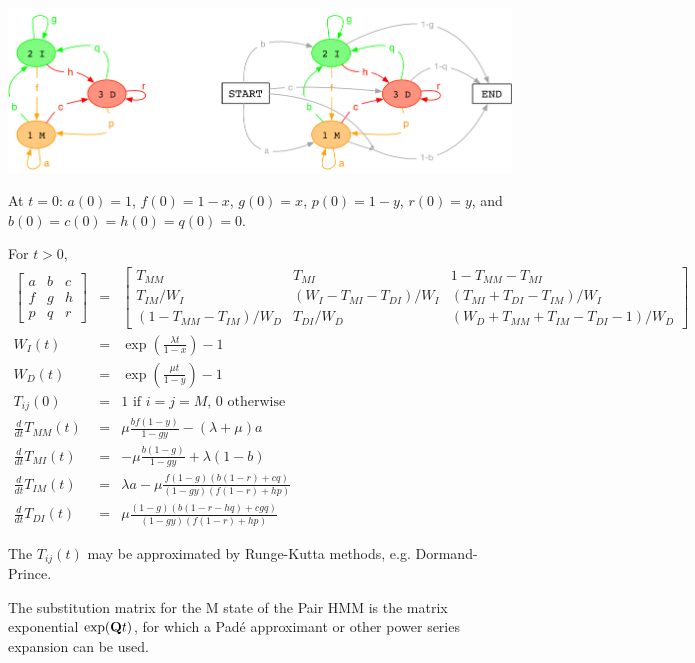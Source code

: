 \documentclass{article}
\begin{document}
\includegraphics[width=\textwidth]{PairHMM.pdf}

At $t=0$: $a(0)=1$, $f(0)=1-x$, $g(0)=x$, $p(0)=1-y$, $r(0)=y$, and $b(0)=c(0)=h(0)=q(0)=0$.

For $t>0$, %
\begin{eqnarray*}
\begin{bmatrix}
a & b & c \\
f & g & h \\
p & q & r 
\end{bmatrix}
& = &
\begin{bmatrix}
T_{MM} & T_{MI} & 1-T_{MM}-T_{MI} \\
T_{IM}/W_I & (W_I-T_{MI}-T_{DI})/W_I & (T_{MI}+T_{DI}-T_{IM})/W_I \\
(1-T_{MM}-T_{IM})/W_D & T_{DI}/W_D & (W_D+T_{MM}+T_{IM}-T_{DI}-1)/W_D 
\end{bmatrix}
\\
W_I(t) & = & \exp\left(\frac{\lambda t}{1-x}\right)-1 \\
W_D(t) & = & \exp\left(\frac{\mu t}{1-y}\right)-1 \\
T_{ij}(0) & = & \mbox{1 if $i=j=M$, 0 otherwise}
\\
  \frac{d}{dt} T_{MM}(t) & = &
  \mu \frac{b f (1-y)}{1 - g y}-(\lambda +\mu )a
  \nonumber \\
  \frac{d}{dt} T_{MI}(t) & = &
  -\mu \frac{b (1-g)}{1 - g y} + \lambda (1-b)
  \nonumber \\
  \frac{d}{dt} T_{IM}(t) & = &
  \lambda a - \mu \frac{f (1-g) (b (1-r)+c q)}{(1 - g y) (f (1-r)+h p)}
  \nonumber \\
  \frac{d}{dt} T_{DI}(t) & = &
  \mu \frac{(1-g) (b (1-r-h q)+c g q)}{(1-g y) (f (1-r)+h p)}
\end{eqnarray*}

The $T_{ij}(t)$ may be approximated by Runge-Kutta methods,
e.g. Dormand-Prince. %

The substitution matrix for the M state of the Pair HMM is
the matrix exponential $\exp({\bf Q}t)$, for which a Pad\'{e} approximant
or other power series expansion can be used. %
\end{document}
